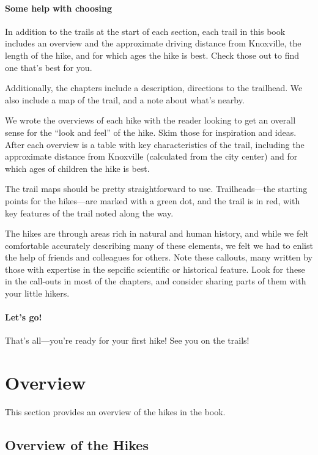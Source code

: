 \documentclass[
  letterpaper,
  DIV=11,
  numbers=noendperiod]{scrreprt}
\begin{document}
\subsection{Some help with choosing}\label{some-help-with-choosing}

In addition to the trails at the start of each section, each trail in
this book includes an overview and the approximate driving distance from
Knoxville, the length of the hike, and for which ages the hike is best.
Check those out to find one that's best for you.

Additionally, the chapters include a description, directions to the
trailhead. We also include a map of the trail, and a note about what's
nearby.

We wrote the overviews of each hike with the reader looking to get an
overall sense for the ``look and feel'' of the hike. Skim those for
inspiration and ideas. After each overview is a table with key
characteristics of the trail, including the approximate distance from
Knoxville (calculated from the city center) and for which ages of
children the hike is best.

The trail maps should be pretty straightforward to use. Trailheads---the
starting points for the hikes---are marked with a green dot, and the
trail is in red, with key features of the trail noted along the way.

The hikes are through areas rich in natural and human history, and while
we felt comfortable accurately describing many of these elements, we
felt we had to enlist the help of friends and colleagues for others.
Note these callouts, many written by those with expertise in the
sepcific scientific or historical feature. Look for these in the
call-outs in most of the chapters, and consider sharing parts of them
with your little hikers.

\subsection{Let's go!}\label{lets-go}

That's all---you're ready for your first hike! See you on the trails!

\part{Overview}

This section provides an overview of the hikes in the book.

\chapter{Overview of the Hikes}\label{overview-of-the-hikes}
\end{document}
